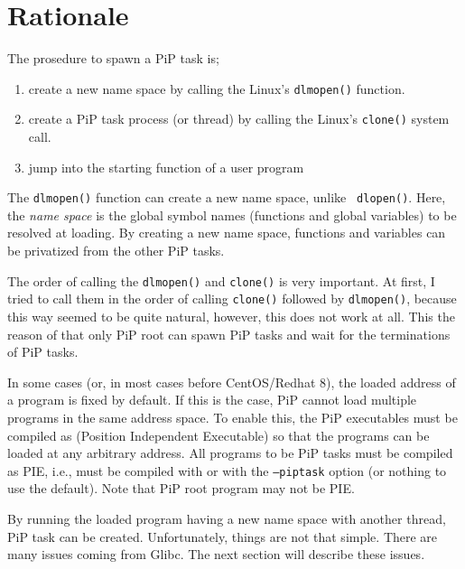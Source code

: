 
\section{Rationale}\label{sec:rationale}

The prosedure to spawn a PiP task is;

\begin{enumerate}
\item create a new name space by calling the Linux's {\tt dlmopen()}
  function.
\item create a PiP task process (or thread) by calling the Linux's
  {\tt clone()} system call.
\item jump into the starting function of a user program
\end{enumerate}

The {\tt dlmopen()} function can create a new name space, unlike {\tt
  dlopen()}. Here, the {\it name space} is the global symbol names
(functions and global variables) to be resolved at loading. By
creating a new name space, functions and variables can be
privatized from the other PiP tasks. 

The order of calling the {\tt dlmopen()} and {\tt clone()} is very
important.  At first, I tried to call them in the order of calling
{\tt clone()} followed by {\tt dlmopen()}, because this way seemed to be
quite natural, however, this does not work at all. This the reason of
that only PiP root can spawn PiP tasks and wait for the terminations
of PiP tasks. 

In some cases (or, in most cases before CentOS/Redhat 8), the loaded
address of a program is fixed by default. If this is the case, PiP
cannot load multiple programs in the same address space. To enable
this, the PiP executables must be compiled as  (Position
Independent Executable) so that the programs can be loaded at any
arbitrary address. All programs to be PiP tasks must be compiled as
PIE, i.e., must be compiled with  or 
with the {\tt --piptask} option (or nothing to use the default). Note
that PiP root program may not be PIE.  

By running the loaded program having a new name space with another
thread, PiP task can be created. Unfortunately, things are not that
simple. There are many issues coming from Glibc. The next section will
describe these issues. 
